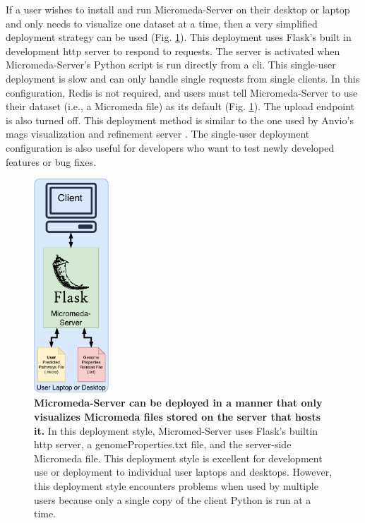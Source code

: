 If a user wishes to install and run Micromeda-Server on their desktop or laptop and only needs to visualize one dataset at a time, then a very simplified deployment strategy can be used (Fig. \ref{fig:micromeda-small-deploy}). This deployment uses Flask's built in development \gls{http} server to respond to requests. The server is activated when Micromeda-Server's Python script is run directly from a \gls{cli}. This single-user deployment is slow and can only handle single requests from single clients. In this configuration, Redis is not required, and users must tell Micromeda-Server to use their dataset (i.e., a Micromeda file) as its default (Fig. \ref{fig:micromeda-small-deploy}). The upload endpoint is also turned off. This deployment method is similar to the one used by Anvio's \gls{mags} visualization and refinement server \cite{eren2015anvi}. The single-user deployment configuration is also useful for developers who want to test newly developed features or bug fixes.

\begin{figure}[!ht]
  \centering
	\includegraphics[width=0.25\textwidth]{media/micromeda-simple-deployment.pdf}
	 \caption[Micromeda-Server can be deployed in a manner that only visualizes Micromeda files stored on the server that hosts it.]{\textbf{Micromeda-Server can be deployed in a manner that only visualizes Micromeda files stored on the server that hosts it.} In this deployment style, Micromed-Server uses Flask's builtin \gls{http} server, a genomeProperties.txt file, and the server-side Micromeda file. This deployment style is excellent for development use or deployment to individual user laptops and desktops. However, this deployment style encounters problems when used by multiple users because only a single copy of the client Python is run at a time.}
	 \label{fig:micromeda-small-deploy}
\end{figure}

